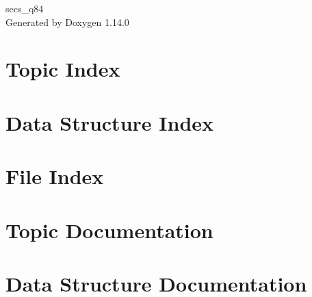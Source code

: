 \documentclass[twoside]{book}
\newcommand{\+}{\discretionary{\mbox{\scriptsize$\hookleftarrow$}}{}{}}
\newcommand{\clearemptydoublepage}{%
    \newpage{\pagestyle{empty}\cleardoublepage}%
  }
\begin{document}
  \raggedbottom
    \hypersetup{pageanchor=false,
                bookmarksnumbered=true,
                pdfencoding=unicode
               }
  \begin{titlepage}
  \vspace*{7cm}
  \begin{center}%
  {\Large secs\+\_\+q84}\\
  \vspace*{1cm}
  {\large Generated by Doxygen 1.14.0}\\
  \end{center}
  \end{titlepage}
  \clearemptydoublepage
  \tableofcontents
  \clearemptydoublepage
  \hypersetup{pageanchor=true}
\chapter{Topic Index}

\chapter{Data Structure Index}

\chapter{File Index}

\chapter{Topic Documentation}

\chapter{Data Structure Documentation}



























\end{document}
